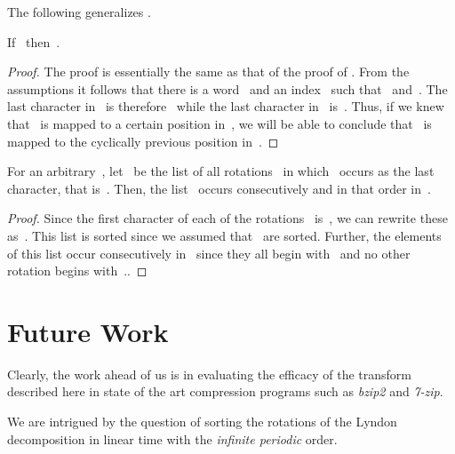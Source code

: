 \documentclass[a4paper,12pt]{article}
\numberwithin{algorithm}{section}
\begin{document}
The following generalizes .
\begin{Lemma}[next:m]
If~ then~.
\end{Lemma}

\begin{proof}
The proof is essentially the same as that of the proof of .
From the assumptions it follows that there is a word~ and an index~ such
  that~ and~.
The last character in~ is therefore~ while the last character in~
  is~.
Thus, if we knew that~ is mapped to a certain position in~, we will be able to conclude
  that~ is mapped
  to the cyclically previous position in~.
\end{proof}


\begin{Lemma}[match:m]
For an arbitrary~, let~ be the list of
  all rotations~ in  which~ occurs as the last character, that is~.
Then, the list~ occurs consecutively and in that order in~.
\end{Lemma}

\begin{proof}
Since the first character of each of the rotations~ is~,
  we can rewrite these
  as~.
This list is sorted since we assumed
 that~ are sorted.
Further, the elements of this list occur consecutively in~ since they all begin with~ and no other rotation
  begins with~..
\end{proof}

\section{Future Work}
\label{Section:Final}
Clearly, the work ahead of us is in evaluating the efficacy of the transform described here in
state of the art compression programs such as \emph{bzip2} and \emph{7-zip}.

We are intrigued by the question of sorting the rotations of the Lyndon decomposition
  in linear time with the \emph{infinite periodic} order.



\end{document}

